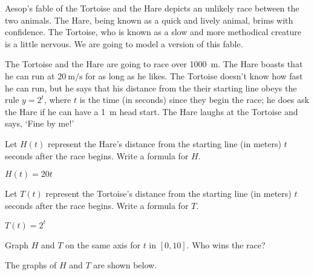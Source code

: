 \begin{problem}
Aesop's fable of the Tortoise and the Hare depicts an unlikely race between
the two animals. The Hare, being known as a quick and lively animal, brims
with confidence. The Tortoise, who is known as a slow and more methodical
creature is a little nervous. We are going to model a version of this fable.
			
The Tortoise and the Hare are going to race over \SI{1000}{\meter}. The Hare boasts
that he can run at $\SI{20}{\meter\per\second}$ for as long as he likes. The 
Tortoise doesn't know how fast he can run, but he says that his distance from the 
their starting line obeys the rule $y=2^t$, where $t$ is the time (in seconds) 
since they begin the race; he does ask the Hare if he can have a \SI{1}{\meter} head start. 
The Hare laughs at the Tortoise and says, `Fine by me!'
\begin{subproblem}
	Let $H(t)$ represent the Hare's distance from the starting line (in meters) $t$ seconds 
	after the race begins. Write a formula for $H$.
	\begin{shortsolution}
		$H(t)=20t$
	\end{shortsolution}
\end{subproblem}
\begin{subproblem}
	Let $T(t)$ represent the Tortoise's distance from the starting line (in meters) $t$ seconds
	after the race begins. Write a formula for $T$.
	\begin{shortsolution}
		$T(t)=2^t$
	\end{shortsolution}
\end{subproblem}
\begin{subproblem}
	Graph $H$ and $T$ on the same axis for $t$ in $[0,10]$. Who wins the race?
	\begin{shortsolution}
		The graphs of $H$ and $T$  are shown below.
																			

\end{shortsolution}
\end{subproblem}
\end{problem}
